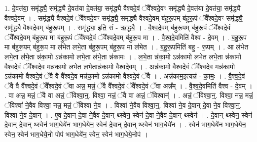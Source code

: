 \documentclass[17pt]{extarticle}
\begin{document}
1. दे॒वत॑या॒ समृ॑द्ध्यै॒ समृ॑द्ध्यै दे॒वत॑या दे॒वत॑या॒ समृ॑द्ध्यै वैश्वदे॒वं ॅवै᳚श्वदे॒वꣳ समृ॑द्ध्यै दे॒वत॑या दे॒वत॑या॒ समृ॑द्ध्यै वैश्वदे॒वम् । . समृ॑द्ध्यै वैश्वदे॒वं ॅवै᳚श्वदे॒वꣳ समृ॑द्ध्यै॒ समृ॑द्ध्यै वैश्वदे॒वम् ब॑हुरू॒पम् ब॑हुरू॒पं ॅवै᳚श्वदे॒वꣳ समृ॑द्ध्यै॒ समृ॑द्ध्यै वैश्वदे॒वम् ब॑हुरू॒पम् । . समृ॑द्ध्या॒ इति॒ सं - ऋ॒द्ध्यै॒ । . वै॒श्व॒दे॒वम् ब॑हुरू॒पम् ब॑हुरू॒पं ॅवै᳚श्वदे॒वं ॅवै᳚श्वदे॒वम् ब॑हुरू॒प मा ब॑हुरू॒पं ॅवै᳚श्वदे॒वं ॅवै᳚श्वदे॒वम् ब॑हुरू॒प मा । . वै॒श्व॒दे॒वमिति॑ वैश्व - दे॒वम् । . ब॒हु॒रू॒प मा ब॑हुरू॒पम् ब॑हुरू॒प मा ल॑भेत लभे॒ता ब॑हुरू॒पम् ब॑हुरू॒प मा ल॑भेत । . ब॒हु॒रू॒पमिति॑ बहु - रू॒पम् । . आ ल॑भेत लभे॒ता ल॑भे॒ता न्न॑का॒मो ऽन्न॑कामो लभे॒ता ल॑भे॒ता न्न॑कामः । . ल॒भे॒ता न्न॑का॒मो ऽन्न॑कामो लभेत लभे॒ता न्न॑कामो वैश्वदे॒वं ॅवै᳚श्वदे॒व मन्न॑कामो लभेत लभे॒तान्न॑कामो वैश्वदे॒वम् । . अन्न॑कामो वैश्वदे॒वं ॅवै᳚श्वदे॒व मन्न॑का॒मो ऽन्न॑कामो वैश्वदे॒वं ॅवै वै वै᳚श्वदे॒व मन्न॑का॒मो ऽन्न॑कामो वैश्वदे॒वं ॅवै । . अन्न॑काम॒इत्यन्न॑ - का॒मः॒ । . वै॒श्व॒दे॒वं ॅवै वै वै᳚श्वदे॒वं ॅवै᳚श्वदे॒वं ॅवा अन्न॒ मन्नं॒ ॅवै वै᳚श्वदे॒वं ॅवै᳚श्वदे॒वं ॅवा अन्न᳚म् । . वै॒श्व॒दे॒वमिति॑ वैश्व - दे॒वम् । . वा अन्न॒ मन्नं॒ ॅवै वा अन्नं॒ ॅविश्वा॒न्॒. विश्वा॒ नन्नं॒ ॅवै वा अन्नं॒ ॅविश्वान्॑ । . अन्नं॒ ॅविश्वा॒न्॒. विश्वा॒ नन्न॒ मन्नं॒ ॅविश्वा॑ ने॒वैव विश्वा॒ नन्न॒ मन्नं॒ ॅविश्वा॑ ने॒व । . विश्वा॑ ने॒वैव विश्वा॒न्॒. विश्वा॑ ने॒व दे॒वान् दे॒वा ने॒व विश्वा॒न्॒. विश्वा॑ ने॒व दे॒वान् । . ए॒व दे॒वान् दे॒वा ने॒वैव दे॒वान् थ्स्वेन॒ स्वेन॑ दे॒वा ने॒वैव दे॒वान् थ्स्वेन॑ । . दे॒वान् थ्स्वेन॒ स्वेन॑ दे॒वान् दे॒वान् थ्स्वेन॑ भाग॒धेये॑न भाग॒धेये॑न॒ स्वेन॑ दे॒वान् दे॒वान् थ्स्वेन॑ भाग॒धेये॑न । . स्वेन॑ भाग॒धेये॑न भाग॒धेये॑न॒ स्वेन॒ स्वेन॑ भाग॒धेये॒नो पोप॑ भाग॒धेये॑न॒ स्वेन॒ स्वेन॑ भाग॒धेये॒नोप॑ । \newline
\end{document}

